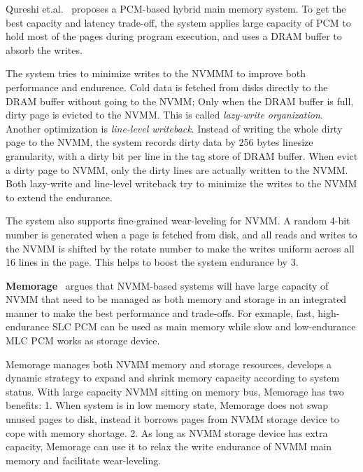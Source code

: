 
Qureshi et.al.~\cite{PCMHierarchy} proposes a PCM-based hybrid main memory
system. To get the best capacity and latency trade-off, the system applies
large capacity of PCM to hold most of the pages during program execution,
and uses a DRAM buffer to absorb the writes. 

The system tries to minimize writes to the NVMMM to improve both performance
and endurence. Cold data is fetched from disks directly to the DRAM buffer
without going to the NVMM; Only when the DRAM buffer is full, dirty page is 
evicted to the NVMM. This is called \emph{lazy-write organization}. Another
optimization is \emph{line-level writeback}. Instead of writing the whole dirty
page to the NVMM, the system records dirty data by 256 bytes linesize
granularity, with a dirty bit per line in the tag store of DRAM buffer.
When evict a dirty page to NVMM, only the dirty lines are actually written to
the NVMM. Both lazy-write and line-level writeback try to minimize the writes
to the NVMM to extend the endurance.

The system also supports fine-grained wear-leveling for NVMM. A random 4-bit 
number is generated when a page is fetched from disk, and all reads and writes
to the NVMM is shifted by the rotate number to make
the writes uniform across all 16 lines in the page.
This helps to boost the system endurance by 3\x{}.

\textbf{Memorage}~\cite{memorage} argues that NVMM-based systems will have large
capacity of NVMM that need to be managed as both memory and storage in
an integrated manner to make the best performance and trade-offs. For exmaple,
fast, high-endurance SLC PCM can be used as main memory
while slow and low-endurance MLC PCM works as storage device.

Memorage manages both NVMM memory and storage resources, develops a dynamic
strategy to expand and shrink memory capacity according to system status. 
With large capacity NVMM sitting on memory bus, Memorage has two benefits:
1. When system is in low memory state, Memorage does not swap unused pages
to disk, instead it borrows pages from NVMM storage device to cope with
memory shortage.
2. As long as NVMM storage device has extra capacity, Memorage can use it
to relax the write endurance of NVMM main memory and facilitate wear-leveling.

